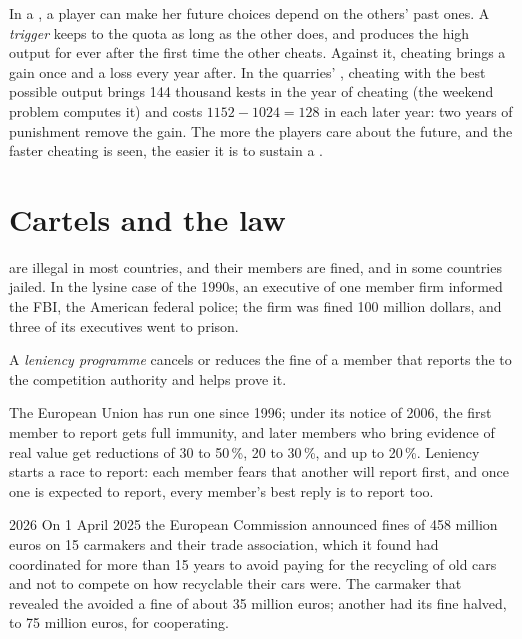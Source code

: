 In a , a player can make her future choices depend on the others' past ones. A \emph{trigger } keeps to the quota as long as the other does, and
produces the high output for ever after the first time the other cheats. Against it, cheating brings a gain once and a loss every year after. In the quarries' ,
cheating with the best possible output brings 144 thousand kests in the year of cheating (the weekend problem computes it) and costs $1152 - 1024 = 128$ in each later
year: two years of punishment remove the gain. The more the players care about the future, and the faster cheating is seen, the easier it is to sustain a .

\section{Cartels and the law}\label{sec:g11:oligopoly-and-games:law}

 are illegal in most countries, and their members are fined, and in some countries jailed. In the lysine case of the 1990s, an executive of one member firm
informed the FBI, the American federal police; the firm was fined 100 million dollars, and three of its executives went to prison.

\begin{definition}\label{def:g11:oligopoly-and-games:leniency}
A \emph{leniency programme} cancels or reduces the fine of a  member that reports the  to the competition authority and helps
prove it.
\end{definition}

The European Union has run one since 1996; under its notice of 2006, the first member to report gets full immunity, and later members who bring evidence of real
value get reductions of 30 to 50\,\%, 20 to 30\,\%, and up to 20\,\%. Leniency starts a race to report: each member fears that another will report first, and once one is
expected to report, every member's best reply is to report too.

\begin{dated}{2026}
On 1 April 2025 the European Commission announced fines of 458 million euros on 15 carmakers and their trade association, which it found had coordinated for more than
15 years to avoid paying for the recycling of old cars and not to compete on how recyclable their cars were. The carmaker that revealed the  avoided a fine of
about 35 million euros; another had its fine halved, to 75 million euros, for cooperating.
\end{dated}

